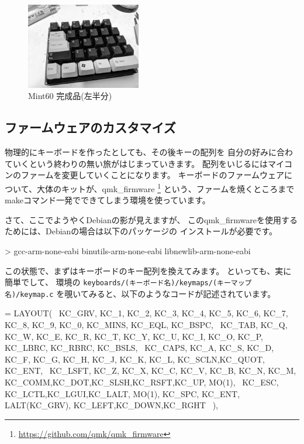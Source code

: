 \documentclass[mingoth,a4paper]{jsarticle}
\begin{document}
\begin{figure}[htbp]
 \begin{center}
  \includegraphics[keepaspectratio,width=5cm]{./image201911-kansai-02/mint60.jpg}
 \end{center}
 \vspace*{-1zw}
 \caption{Mint60 完成品(左半分)}
 \label{fig:mint60-katsu}
\end{figure}

\subsection{ファームウェアのカスタマイズ}

物理的にキーボードを作ったとしても、その後キーの配列を
自分の好みに合わていくという終わりの無い旅がはじまっていきます。
配列をいじるにはマイコンのファームを変更していくことになります。
キーボードのファームウェアについて、大体のキットが、qmk\_firmware%
\footnote{\url{https://github.com/qmk/qmk_firmware}}
という、ファームを焼くところまでmakeコマンド一発でできてしまう環境を使っています。

さて、ここでようやくDebianの影が見えますが、
このqmk\_firmwareを使用するためには、Debianの場合は以下のパッケージの
インストールが必要です。

\begin{commandline}
> gcc-arm-none-eabi binutils-arm-none-eabi libnewlib-arm-none-eabi
\end{commandline}

この状態で、まずはキーボードのキー配列を換えてみます。
といっても、実に簡単でして、
環境の \verb|keyboards/(キーボード名)/keymaps/(キーマップ名)/keymap.c|
を覗いてみると、以下のようなコードが記述されています。

\begin{commandline}
[0] = LAYOUT( \
KC_GRV,  KC_1,  KC_2,  KC_3,  KC_4,  KC_5,     KC_6,  KC_7,  KC_8,  KC_9,  KC_0,  KC_MINS, KC_EQL,   KC_BSPC,  \
KC_TAB,   KC_Q,  KC_W,  KC_E,  KC_R,  KC_T,     KC_Y,  KC_U,  KC_I,  KC_O,  KC_P,  KC_LBRC, KC_RBRC, KC_BSLS,  \
KC_CAPS,   KC_A,  KC_S,  KC_D,  KC_F,  KC_G,     KC_H,  KC_J,  KC_K,  KC_L,  KC_SCLN,KC_QUOT,        KC_ENT,   \
KC_LSFT,    KC_Z,  KC_X,  KC_C,  KC_V,  KC_B,     KC_N,  KC_M,  KC_COMM,KC_DOT,KC_SLSH,KC_RSFT,KC_UP,  MO(1),  \
KC_ESC,  KC_LCTL,KC_LGUI,KC_LALT,  MO(1),    KC_SPC, KC_ENT,  LALT(KC_GRV),           KC_LEFT,KC_DOWN,KC_RGHT  \
),
\end{commandline}
\end{document}

